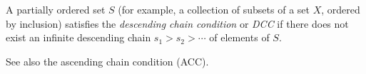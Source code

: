 \documentclass{article}
\begin{document}
A partially ordered set $S$ (for example, a collection of subsets of a set $X$, ordered by inclusion) satisfies the {\it descending chain condition} or {\it DCC} if there does not exist an infinite descending chain $s_1 > s_2 > \cdots$ of elements of $S$.

See also the ascending chain condition (ACC).
\end{document}
